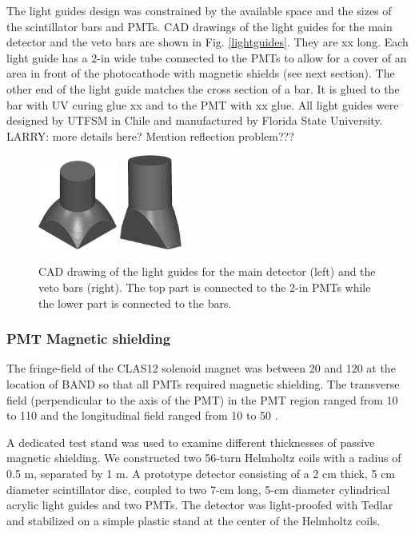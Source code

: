 \documentclass[3p,final,twocolumn]{elsarticle}
\begin{document}
The light guides design was constrained by the available space and the
sizes of the scintillator bars and PMTs. CAD drawings of the light guides for the main detector and the veto bars are shown in Fig. \ref{lightguides}. They are xx long. Each light guide has a 2-in wide tube connected to the PMTs to allow for a cover of an area in front of the photocathode with magnetic shields (see next section). The other end of the light guide matches the cross section of a bar. It is glued to the bar with UV curing glue xx and to the PMT with xx glue. All light guides were designed by UTFSM in Chile and manufactured by Florida State University.  
{\color{red} LARRY: more details here? Mention reflection problem???}
\begin{figure}[tb]
	\centering
	\includegraphics[width=0.23\textwidth]{bar_lg.png}
		\includegraphics[width=0.18\textwidth]{veto_lg.png}
	\caption{CAD drawing of the light guides for the main detector (left) and the veto bars (right). The top part is connected to the 2-in PMTs while the lower part is connected to the bars.}
	\label{fig:lightguides}
\end{figure}

\subsubsection{PMT Magnetic shielding}
The fringe-field of the CLAS12 solenoid magnet
\cite{Fair:2020yfx} was between 20 and 120 \si{\gauss} at the location of
BAND so that all PMTs required magnetic shielding. The transverse
field (perpendicular to the axis of the PMT) in the PMT region ranged from 10 to
  110 \si{\gauss} and the longitudinal field ranged from 10 to 50 \si{\gauss}.

  A dedicated test stand was used to examine different thicknesses of
  passive magnetic shielding.  We constructed two 56-turn Helmholtz
  coils with a radius of 0.5 \si{\meter}, separated by 1 \si{\meter}. A
  prototype detector consisting of a 2 \si{\centi\meter} thick, 5
  \si{\centi\meter} diameter scintillator disc, coupled to two
  7-\si{\centi\meter} long, 5-\si{\centi\meter} diameter cylindrical
  acrylic light guides and two PMTs. The detector was
  light-proofed with Tedlar and stabilized on a simple plastic stand
  at the center of the Helmholtz coils.
\end{document}
